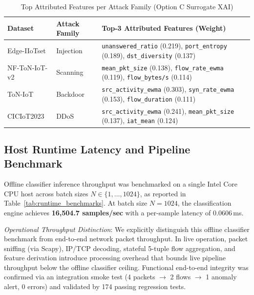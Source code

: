 \documentclass[10pt,journal,compsoc,twocolumn]{IEEEtran}
\begin{document}
\begin{table}[htbp]
\caption{Top Attributed Features per Attack Family (Option C Surrogate XAI)}
\label{tab:xai_attribution}
\centering
\begin{tabular}{llp{4.8cm}}
\toprule
\textbf{Dataset} & \textbf{Attack Family} & \textbf{Top-3 Attributed Features (Weight)} \\
\midrule
Edge-IIoTset & Injection & \texttt{unanswered\_ratio} (0.219), \texttt{port\_entropy} (0.189), \texttt{dst\_diversity} (0.137) \\
NF-ToN-IoT-v2 & Scanning & \texttt{mean\_pkt\_size} (0.138), \texttt{flow\_rate\_ewma} (0.119), \texttt{flow\_bytes/s} (0.114) \\
ToN-IoT & Backdoor & \texttt{src\_activity\_ewma} (0.303), \texttt{syn\_rate\_ewma} (0.153), \texttt{flow\_duration} (0.111) \\
CICIoT2023 & DDoS & \texttt{src\_activity\_ewma} (0.241), \texttt{mean\_pkt\_size} (0.137), \texttt{iat\_mean} (0.124) \\
\bottomrule
\end{tabular}
\end{table}

\subsection{Host Runtime Latency and Pipeline Benchmark}
Offline classifier inference throughput was benchmarked on a single Intel Core CPU host across batch sizes $N \in \{1, \dots, 1024\}$, as reported in Table~\ref{tab:runtime_benchmarks}. At batch size $N=1024$, the classification engine achieves \textbf{16,504.7 samples/sec} with a per-sample latency of $0.0606$\,ms. 

\textit{Operational Throughput Distinction}: We explicitly distinguish this offline classifier benchmark from end-to-end network packet throughput. In live operation, packet sniffing (via Scapy), IP/TCP decoding, stateful 5-tuple flow aggregation, and feature derivation introduce processing overhead that bounds live pipeline throughput below the offline classifier ceiling. Functional end-to-end integrity was confirmed via an integration smoke test (4 packets $\to$ 2 flows $\to$ 1 anomaly alert, 0 errors) and validated by 174 passing regression tests.
\end{document}
